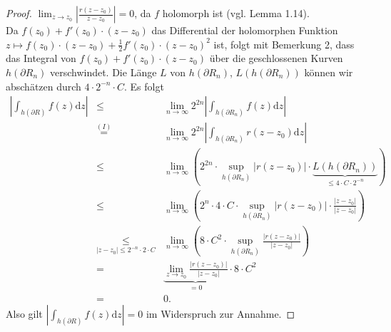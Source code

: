 \documentclass[11pt,titlepage]{article}
\theoremstyle{definition}
\theoremstyle{remark}
\begin{document}
\begin{proof}
		$\lim_{z\to z_0} |\frac{r(z-z_0)}{z-z_0}|=0$, da $f$ holomorph ist (vgl. Lemma 1.14).\\
		Da $f(z_0)+f'(z_0)\cdot (z-z_0)$ das Differential der holomorphen Funktion
		$z\mapsto f(z_0)\cdot (z-z_0)+\frac{1}{2}f'(z_0)\cdot (z-z_0)^2$ ist, folgt mit Bemerkung 2, dass 
		das Integral von $f(z_0)+f'(z_0)\cdot (z-z_0)$ über die geschlossenen Kurven $h(\partial R_n)$ 
		verschwindet. Die Länge $L$ von $h(\partial R_n)$, $L(h(\partial R_n))$ können wir abschätzen 
		durch $4\cdot 2^{-n}\cdot C$. Es folgt
		\begin{eqnarray*}
			\left| \int_{h(\partial R)}f(z)\mathrm{d}z \right| 
			&\leq& \lim_{n\to\infty} 2^{2n} \left| \int_{h(\partial R_n)}f(z)\mathrm{d}z \right| \\
			&\overset{(I)}{=}& \lim_{n\to\infty} 2^{2n} \left|\int_{h(\partial R_n)}
			r(z-z_0)\mathrm{d}z \right| \\
			&\leq& \lim_{n\to\infty} \left( 2^{2n} \cdot \sup_{h(\partial R_n)}|r(z-z_0)|\cdot 
			\underbrace{L(h(\partial R_n))}_{\leq 4\cdot C\cdot 
			2^{-n}}\right) \\
			&\leq& \lim_{n\to\infty} \left(2^n \cdot 4\cdot C \cdot \sup_{h(\partial R_n)} |r(z-z_0)| \cdot 
			\frac{|z-z_0|}{|z-z_0|}\right) \\
			&\underset{|z-z_0|\leq 2^{-n}\cdot 2\cdot C}{\leq}& \lim_{n\to\infty} \left(8\cdot C^2 \cdot
			\sup_{h(\partial R_n)} \frac{|r(z-z_0)|}{|z-z_0|}\right) \\
			&=& \underbrace{\lim_{z\to z_0} \frac{|r(z-z_0)|}{|z-z_0|}}_{=0}\cdot 8\cdot C^2 \\
			&=&0.
		\end{eqnarray*}
		Also gilt $| \int_{h(\partial R)}f(z)\mathrm{d}z |=0$ im Widerspruch zur Annahme.
	\end{proof}
\end{document}
